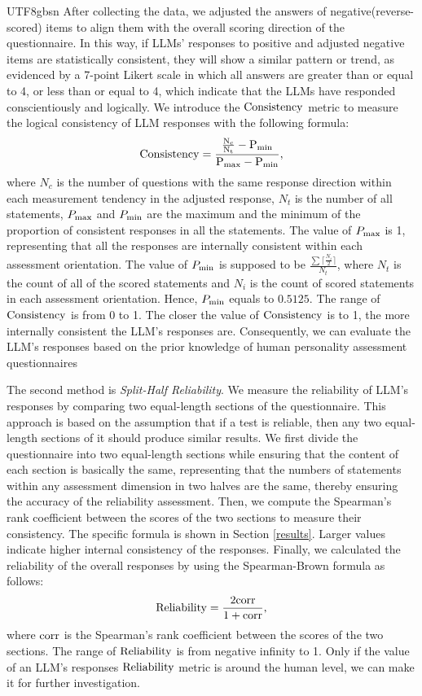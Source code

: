 \documentclass{article}
\theoremstyle{plain}
\theoremstyle{definition}
\theoremstyle{remark}
\begin{document}
\begin{CJK*}{UTF8}{gbsn}
After collecting the data, we adjusted the answers of negative(reverse-scored) items to align them with the overall scoring direction of the questionnaire. In this way, if LLMs' responses to positive and adjusted negative items are statistically consistent, they will show a similar pattern or trend, as evidenced by a 7-point Likert scale in which all answers are greater than or equal to 4, or less than or equal to 4, which indicate that the LLMs have responded conscientiously and logically. We introduce the $\rm{Consistency}$ metric to measure the logical consistency of LLM responses with the following formula:
\begin{equation}
\rm{Consistency} = \frac{\frac{N_c}{N_t}-{P_{\rm{min}}}}{{P_{\rm{max}}}-{P_{\rm{min}}}},    
\end{equation}
where $N_c$ is the number of questions with the same response direction within each measurement tendency in the adjusted response, $N_t$ is the number of all statements, $P_{\rm{max}}$ and $P_{\rm{min}}$ are the maximum and the minimum of the proportion of consistent responses in all the statements. The value of  $P_{\rm{max}}$ is 1, representing that all the responses are internally consistent within each assessment orientation. The value of $P_{\rm{min}}$ is supposed to be $\frac{\sum \lceil \frac{N_i}{2} \rceil}{N_t}$, where $N_t$ is the count of all of the scored statements and $N_i$ is the count of scored statements in each assessment orientation.  Hence, $P_{\rm{min}}$ equals to $0.5125$. The range of $\rm{Consistency}$ is from 0 to 1. The closer the value of $\rm{Consistency}$ is to 1, the more internally consistent the LLM's responses are. Consequently, we can evaluate the LLM's responses based on the prior knowledge of human personality assessment questionnaires

The second method is \textit{Split-Half Reliability}. We measure the reliability of LLM's responses by comparing two equal-length sections of the questionnaire. This approach is based on the assumption that if a test is reliable, then any two equal-length sections of it should produce similar results. We first divide the questionnaire into two equal-length sections while ensuring that the content of each section is basically the same, representing that the numbers of statements within any assessment dimension in two halves are the same, thereby ensuring the accuracy of the reliability assessment. Then, we compute the Spearman's rank coefficient between the scores of the two sections to measure their consistency. The specific formula is shown in Section \ref{results}. Larger values indicate higher internal consistency of the responses. Finally, we calculated the reliability of the overall responses by using the Spearman-Brown formula as follows:
\begin{equation}
\rm{Reliability} = \frac{2\rm{corr}}{1+\rm{corr}},    
\end{equation}
where $\rm{corr}$ is the Spearman's rank coefficient between the scores of the two sections. The range of $\rm{Reliability}$ is from negative infinity to 1. Only if the value of an LLM's responses $\rm{Reliability}$ metric is around the human level, we can make it for further investigation.


\end{CJK*}
\end{document}
